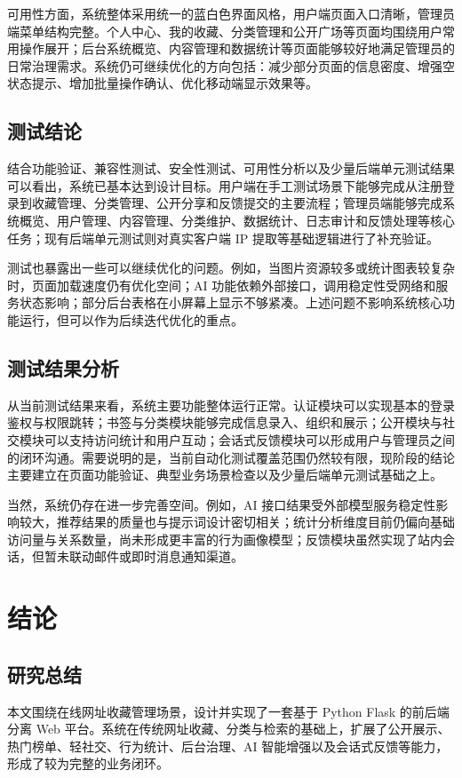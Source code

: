 \documentclass[12pt,a4paper]{ctexart}
\begin{document}
可用性方面，系统整体采用统一的蓝白色界面风格，用户端页面入口清晰，管理员端菜单结构完整。个人中心、我的收藏、分类管理和公开广场等页面均围绕用户常用操作展开；后台系统概览、内容管理和数据统计等页面能够较好地满足管理员的日常治理需求。系统仍可继续优化的方向包括：减少部分页面的信息密度、增强空状态提示、增加批量操作确认、优化移动端显示效果等。

\subsection{测试结论}
结合功能验证、兼容性测试、安全性测试、可用性分析以及少量后端单元测试结果可以看出，系统已基本达到设计目标。用户端在手工测试场景下能够完成从注册登录到收藏管理、分类管理、公开分享和反馈提交的主要流程；管理员端能够完成系统概览、用户管理、内容管理、分类维护、数据统计、日志审计和反馈处理等核心任务；现有后端单元测试则对真实客户端 IP 提取等基础逻辑进行了补充验证。

测试也暴露出一些可以继续优化的问题。例如，当图片资源较多或统计图表较复杂时，页面加载速度仍有优化空间；AI 功能依赖外部接口，调用稳定性受网络和服务状态影响；部分后台表格在小屏幕上显示不够紧凑。上述问题不影响系统核心功能运行，但可以作为后续迭代优化的重点。

\subsection{测试结果分析}
从当前测试结果来看，系统主要功能整体运行正常。认证模块可以实现基本的登录鉴权与权限跳转；书签与分类模块能够完成信息录入、组织和展示；公开模块与社交模块可以支持访问统计和用户互动；会话式反馈模块可以形成用户与管理员之间的闭环沟通。需要说明的是，当前自动化测试覆盖范围仍然较有限，现阶段的结论主要建立在页面功能验证、典型业务场景检查以及少量后端单元测试基础之上。

当然，系统仍存在进一步完善空间。例如，AI 接口结果受外部模型服务稳定性影响较大，推荐结果的质量也与提示词设计密切相关；统计分析维度目前仍偏向基础访问量与关系数量，尚未形成更丰富的行为画像模型；反馈模块虽然实现了站内会话，但暂未联动邮件或即时消息通知渠道。

\clearpage
\section{结论}

\subsection{研究总结}
本文围绕在线网址收藏管理场景，设计并实现了一套基于 Python Flask 的前后端分离 Web 平台。系统在传统网址收藏、分类与检索的基础上，扩展了公开展示、热门榜单、轻社交、行为统计、后台治理、AI 智能增强以及会话式反馈等能力，形成了较为完整的业务闭环。
\end{document}
